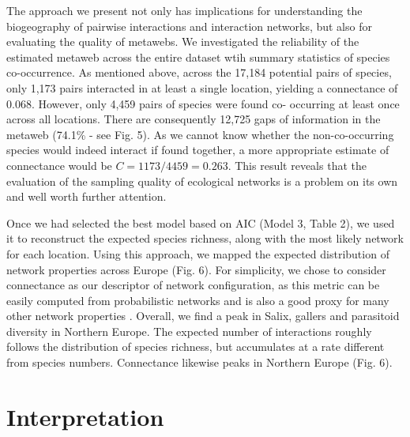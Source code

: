 \documentclass[12pt]{article}
\begin{document}
The approach we present not only has implications for understanding the
biogeography of pairwise interactions and interaction networks, but also for
evaluating the quality of metawebs. We investigated the reliability of the
estimated metaweb across the entire dataset wtih summary statistics of species
co-occurrence. As mentioned above, across the 17,184 potential pairs of
species, only 1,173 pairs interacted in at least a single location, yielding a
connectance of 0.068. However, only 4,459 pairs of species were found co-
occurring at least once across all locations. There are consequently 12,725
gaps of information in the metaweb (74.1\% - see Fig. 5). As we cannot know
whether the non-co-occurring species would indeed interact if found
together, a more appropriate estimate of connectance would be
$C=1173/4459=0.263$. This result reveals that the evaluation of the sampling
quality of ecological networks is a problem on its own and well worth further
attention.

Once we had selected the best model based on AIC (Model 3, Table 2), we used it to
reconstruct the expected species richness, along with the most likely network
for each location. Using this approach, we mapped the expected distribution of
network properties across Europe (Fig. 6). For simplicity, we chose to
consider connectance as our descriptor of network configuration, as this
metric can be easily computed from probabilistic networks \citep{Poisot2015c}
and is also a good proxy for many other network properties \citep{Poisot2014}.
Overall, we find a peak in Salix, gallers and parasitoid diversity in Northern
Europe. The expected number of interactions roughly follows the distribution
of species richness, but accumulates at a rate different from species numbers.
Connectance likewise peaks in Northern Europe (Fig. 6).

\section*{Interpretation}
\end{document}
